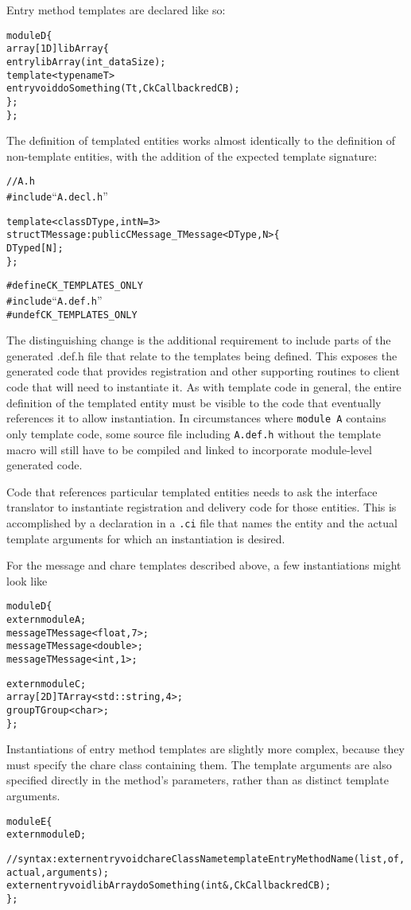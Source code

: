 Entry method templates are declared like so:
\begin{alltt}
module D \{
    array [1D] libArray \{
        entry libArray(int _dataSize);
        template <typename T>
        entry void doSomething(T t, CkCallback redCB);
    \};
\};
\end{alltt}


The definition of templated \charmpp entities works almost identically to the
definition of non-template entities, with the addition of the expected template
signature:
\begin{alltt}
// A.h
#include ``A.decl.h''

template <class DType, int N=3>
struct TMessage : public CMessage_TMessage<DType, N> \{
  DType d[N];
\};

#define CK_TEMPLATES_ONLY
#include ``A.def.h''
#undef CK_TEMPLATES_ONLY
\end{alltt}
The distinguishing change is the additional requirement to include parts of the
generated .def.h file that relate to the templates being defined. This exposes
the generated code that provides registration and other supporting routines to
client code that will need to instantiate it. As with \CC template code in
general, the entire definition of the templated entity must be visible to the
code that eventually references it to allow instantiation. In circumstances
where {\tt module A} contains only template code, some source file including
{\tt A.def.h} without the template macro will still have to be compiled and
linked to incorporate module-level generated code.


Code that references particular templated entities needs to ask the interface
translator to instantiate registration and delivery code for those
entities. This is accomplished by a declaration in a {\tt .ci} file that names
the entity and the actual template arguments for which an instantiation is
desired.

For the message and chare templates described above, a few instantiations might
look like
\begin{alltt}
module D \{
  extern module A;
  message TMessage<float, 7>;
  message TMessage<double>;
  message TMessage<int, 1>;

  extern module C;
  array [2D] TArray<std::string, 4>;
  group TGroup<char>;
\};
\end{alltt}

Instantiations of entry method templates are slightly more complex, because
they must specify the chare class containing them. The template arguments are
also specified directly in the method's parameters, rather than as distinct
template arguments.
\begin{alltt}
module E \{
  extern module D;

  // syntax: extern entry void chareClassName templateEntryMethodName(list, of, actual, arguments);
  extern entry void libArray doSomething(int&, CkCallback redCB);
\};
\end{alltt}

